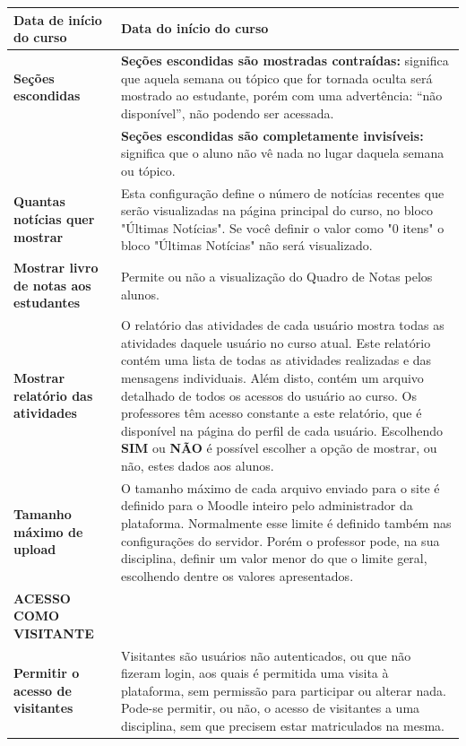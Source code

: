 \begin{longtable}[htbp] {p{6cm}|p{9cm}}
\textbf{Data de início do curso} & Data do início do curso\\\hline
\textbf{Seções escondidas} & \textbf{Seções escondidas são mostradas contraídas:} significa que aquela semana ou tópico que for tornada oculta será mostrado ao estudante, porém com uma advertência: “não disponível”, não podendo ser acessada.\\
& \textbf{Seções escondidas são completamente invisíveis:} significa que o aluno não vê nada no lugar daquela semana ou tópico.
\\\hline
\textbf{Quantas notícias quer mostrar} & Esta configuração define o número de notícias recentes que serão visualizadas na página principal do curso, no bloco "Últimas Notícias".
Se você definir o valor como "0 itens" o bloco "Últimas Notícias" não será visualizado.
\\\hline
\textbf{Mostrar livro de notas aos estudantes} & Permite ou não a visualização do Quadro de Notas pelos alunos.\\\hline
\textbf{Mostrar relatório das atividades} & O relatório das atividades de cada usuário mostra todas as atividades daquele usuário no curso atual. Este relatório contém uma lista de todas as atividades realizadas e das mensagens individuais. Além disto, contém um arquivo detalhado de todos os acessos do usuário ao curso.
Os professores têm acesso constante a este relatório, que é disponível na página do perfil de cada usuário.
Escolhendo \textbf{SIM} ou \textbf{NÃO} é possível escolher a opção de mostrar, ou não, estes dados aos alunos.
\\\hline
\textbf{Tamanho máximo de upload} & O tamanho máximo de cada arquivo enviado para o site é definido para o Moodle inteiro pelo administrador da plataforma. Normalmente esse limite é definido também nas configurações do servidor.
Porém o professor pode, na sua disciplina, definir um valor menor do que o limite geral, escolhendo dentre os valores apresentados.\\\hline
\rowcolor[rgb]{0.8,0.8,0.8} \textbf{ACESSO COMO VISITANTE}&\\\hline
\textbf{Permitir o acesso de visitantes} & Visitantes são usuários não autenticados, ou que não fizeram login, aos quais é permitida uma visita à plataforma, sem permissão para participar ou alterar nada. Pode-se permitir, ou não, o acesso de visitantes a uma disciplina, sem que precisem estar matriculados na mesma.\\\hline

\end{longtable}
